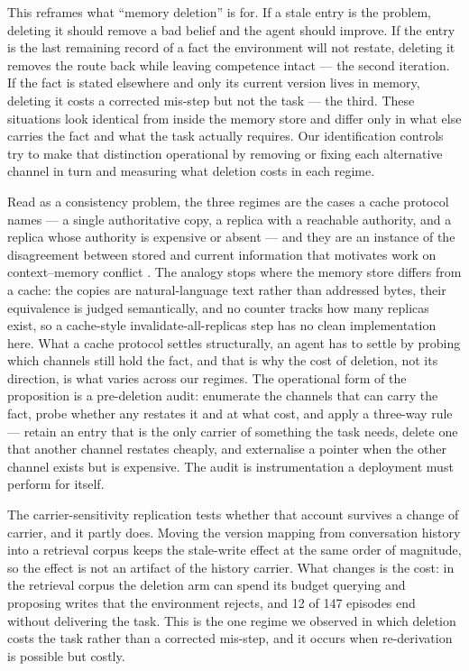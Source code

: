 \documentclass[11pt]{article}
\begin{document}
\begin{sloppypar}
This reframes what ``memory deletion'' is for. If a stale entry is the problem, deleting it should remove a bad belief and the agent should improve. If the entry is the last remaining record of a fact the environment will not restate, deleting it removes the route back while leaving competence intact --- the second iteration. If the fact is stated elsewhere and only its current version lives in memory, deleting it costs a corrected mis-step but not the task --- the third. These situations look identical from inside the memory store and differ only in what else carries the fact and what the task actually requires. Our identification controls try to make that distinction operational by removing or fixing each alternative channel in turn and measuring what deletion costs in each regime.

Read as a consistency problem, the three regimes are the cases a cache protocol names --- a single authoritative copy, a replica with a reachable authority, and a replica whose authority is expensive or absent --- and they are an instance of the disagreement between stored and current information that motivates work on context--memory conflict \cite{xu2024knowledge}. The analogy stops where the memory store differs from a cache: the copies are natural-language text rather than addressed bytes, their equivalence is judged semantically, and no counter tracks how many replicas exist, so a cache-style invalidate-all-replicas step has no clean implementation here. What a cache protocol settles structurally, an agent has to settle by probing which channels still hold the fact, and that is why the cost of deletion, not its direction, is what varies across our regimes. The operational form of the proposition is a pre-deletion audit: enumerate the channels that can carry the fact, probe whether any restates it and at what cost, and apply a three-way rule --- retain an entry that is the only carrier of something the task needs, delete one that another channel restates cheaply, and externalise a pointer when the other channel exists but is expensive. The audit is instrumentation a deployment must perform for itself.

The carrier-sensitivity replication tests whether that account survives a change of carrier, and it partly does. Moving the version mapping from conversation history into a retrieval corpus keeps the stale-write effect at the same order of magnitude, so the effect is not an artifact of the history carrier. What changes is the cost: in the retrieval corpus the deletion arm can spend its budget querying and proposing writes that the environment rejects, and 12 of 147 episodes end without delivering the task. This is the one regime we observed in which deletion costs the task rather than a corrected mis-step, and it occurs when re-derivation is possible but costly.


\end{sloppypar}
\end{document}
